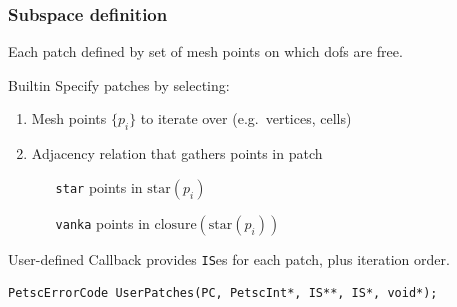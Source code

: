 \documentclass[presentation,aspectratio=43]{beamer}
\begin{document}
\begin{frame}[fragile]
  \frametitle{Subspace definition}
  Each patch defined by set of mesh points on which dofs are free.
  \begin{block}{Builtin}
    Specify patches by selecting:
    \begin{enumerate}
    \item Mesh points $\{p_i\}$ to iterate over (e.g.~vertices, cells)
    \item Adjacency relation that gathers points in patch
      \begin{itemize}
      \item[\texttt{star}] points in $\text{star}(p_i)$
      \item[\texttt{vanka}] points in $\text{closure}(\text{star}(p_i))$
      \end{itemize}
    \end{enumerate}
  \end{block}
  \begin{block}{User-defined}
    Callback provides \texttt{IS}es for each patch, plus iteration order.
\begin{verbatim}
PetscErrorCode UserPatches(PC, PetscInt*, IS**, IS*, void*);
\end{verbatim}
  \end{block}
\end{frame}
\end{document}
